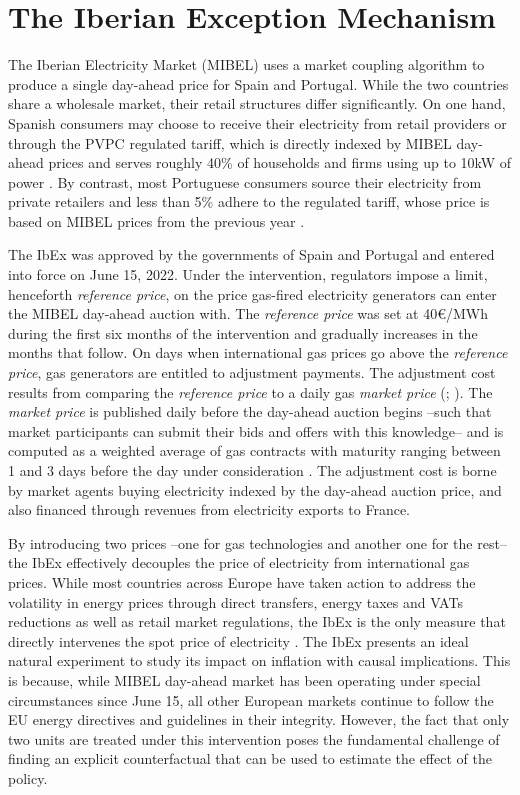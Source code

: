 \documentclass[12pt,a4paper]{article}
\begin{document}
\section{The Iberian Exception Mechanism}\label{ibex}
The Iberian Electricity Market (MIBEL) uses a market coupling algorithm to produce a single day-ahead price for Spain and Portugal. While the two countries share a wholesale market, their retail structures differ significantly. On one hand, Spanish consumers may choose to receive their electricity from retail providers or through the PVPC regulated tariff, which is directly indexed by MIBEL day-ahead prices and serves roughly 40\% of households and firms using up to 10kW of power \parencite{iea2021b}. By contrast, most Portuguese consumers source their electricity from private retailers and less than 5\% adhere to the regulated tariff, whose price is based on MIBEL prices from the previous year \parencite{iea2021a}.\par
The IbEx was approved by the governments of Spain and Portugal and entered into force on June 15, 2022. Under the intervention, regulators impose a limit, henceforth \textit{reference price}, on the price gas-fired electricity generators can enter the MIBEL day-ahead auction with. The \textit{reference price} was set at 40\euro/MWh during the first six months of the intervention and gradually increases in the months that follow. On days when international gas prices go above the \textit{reference price}, gas generators are entitled to adjustment payments. The adjustment cost results from comparing the \textit{reference price} to a daily gas \textit{market price} (\cite{boe2022}; \cite{diario2022}). The \textit{market price} is published daily before the day-ahead auction begins –such that market participants can submit their bids and offers with this knowledge– and is computed as a weighted average of gas contracts with maturity ranging between 1 and 3 days before the day under consideration \parencite{mibgas2022}. The adjustment cost is borne by market agents buying electricity indexed by the day-ahead auction price, and also financed through revenues from electricity exports to France.\par 

By introducing two prices –one for gas technologies and another one for the rest– the IbEx effectively decouples the price of electricity from international gas prices. While most countries across Europe have taken action to address the volatility in energy prices through direct transfers, energy taxes and VATs reductions as well as retail market regulations, the IbEx is the only measure that directly intervenes the spot price of electricity \parencite{sgaravatti2022}. The IbEx presents an ideal natural experiment to study its impact on inflation with causal implications. This is because, while MIBEL day-ahead market has been operating under special circumstances since June 15, all other European markets continue to follow the EU energy directives and guidelines in their integrity. However, the fact that only two units are treated under this intervention poses the fundamental challenge of finding an explicit counterfactual that can be used to estimate the effect of the policy.\par
\end{document}
